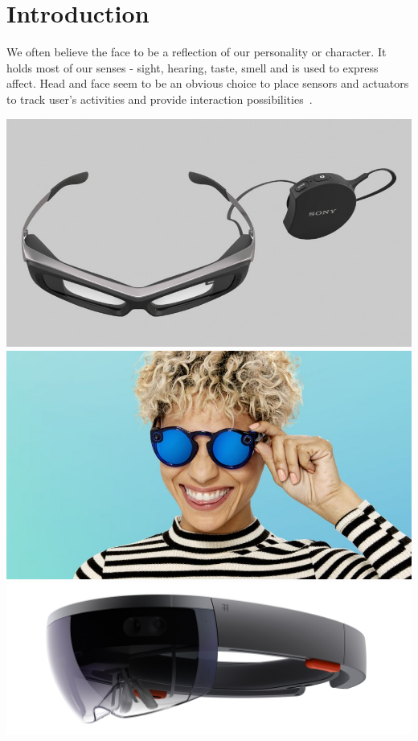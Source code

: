 \documentclass{sigchi-ext}
\begin{document}
\section{Introduction}
We often believe the face to be a reflection of our personality or character. It holds most of our senses - sight, hearing, taste, smell and is used to express affect. Head and face seem to be an obvious choice to place sensors and actuators to track user's activities and provide interaction possibilities~\cite{amft2015making,kuhn2016gphysics}. 
\begin{marginfigure}[0pc]
 \begin{minipage}{\marginparwidth}
   \centering  
      \includegraphics[width=\columnwidth]{figures/sony.jpg}
         \includegraphics[width=\columnwidth]{figures/spectales.jpg}
           \includegraphics[width=\columnwidth]{figures/holo.jpg}

\end{minipage}
\end{marginfigure}
\end{document}
